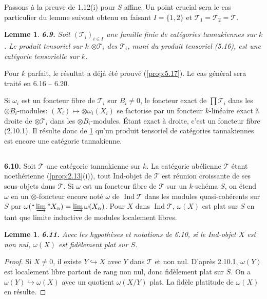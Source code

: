\documentclass[12pt,a4paper]{article}
\theoremstyle{plain}
\newtheorem{lemma}[theorem]{Lemme}
\theoremstyle{definition}
\theoremstyle{remark}
\DeclareMathOperator{\Ind}{Ind}
\begin{document}
Passons à la preuve de 1.12(i) pour $S$ affine. Un point crucial sera le cas particulier du lemme suivant obtenu en faisant $I = \{1,2\}$ et $\mathcal{T}_1 = \mathcal{T}_2 = \mathcal{T}$.

\begin{lemma}\label{lem:6.9}
\textbf{6.9.} Soit $(\mathcal{T}_i)_{i \in I}$ une famille finie de catégories tannakiennes sur $k$. Le produit tensoriel sur $k$ $\otimes \mathcal{T}_i$ des $\mathcal{T}_i$, muni du produit tensoriel (5.16), est une catégorie tensorielle sur $k$.
\end{lemma}

Pour $k$ parfait, le résultat a déjà été prouvé (\ref{prop:5.17}). Le cas général sera traité en 6.16 -- 6.20.

Si $\omega_i$ est un foncteur fibre de $\mathcal{T}_i$ sur $B_i \neq 0$, le foncteur exact de $\prod \mathcal{T}_i$ dans les $\otimes B_i$-modules: $(X_i) \mapsto \otimes \omega_i(X_i)$ se factorise par un foncteur $k$-linéaire exact à droite de $\otimes \mathcal{T}_i$ dans les $\otimes B_i$-modules. Étant exact à droite, c'est un foncteur fibre (2.10.1). Il résulte donc de \ref{lem:6.9} qu'un produit tensoriel de catégories tannakiennes est encore une catégorie tannakienne.

\subsection{}

\textbf{6.10.} Soit $\mathcal{T}$ une catégorie tannakienne sur $k$. La catégorie abélienne $\mathcal{T}$ étant noethérienne (\ref{prop:2.13}(i)), tout Ind-objet de $\mathcal{T}$ est réunion croissante de ses sous-objets dans $\mathcal{T}$. Si $\omega$ est un foncteur fibre de $\mathcal{T}$ sur un $k$-schéma $S$, on étend $\omega$ en un $\otimes$-foncteur encore noté $\omega$ de $\Ind\mathcal{T}$ dans les modules quasi-cohérents sur $S$ par $\omega(``\varinjlim" X_\alpha) = \varinjlim \omega(X_\alpha)$. Pour $X$ dans $\Ind\mathcal{T}$, $\omega(X)$ est plat sur $S$ en tant que limite inductive de modules localement libres.

\begin{lemma}\label{lem:6.11}
\textbf{6.11.} Avec les hypothèses et notations de 6.10, si le Ind-objet $X$ est non nul, $\omega(X)$ est fidèlement plat sur $S$.
\end{lemma}

\begin{proof}
Si $X \neq 0$, il existe $Y \hookrightarrow X$ avec $Y$ dans $\mathcal{T}$ et non nul. D'après 2.10.1, $\omega(Y)$ est localement libre partout de rang non nul, donc fidèlement plat sur $S$. On a $\omega(Y) \hookrightarrow \omega(X)$ avec un quotient $\omega(X/Y)$ plat. La fidèle platitude de $\omega(X)$ en résulte.
\end{proof}
\end{document}
